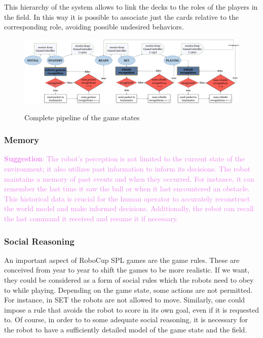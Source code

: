 \documentclass[a4paper, onecolumn, 12pt]{article}
\newcommand\suggestion[1]{\textcolor{violet}{\textbf{Suggestion}: #1}}
\begin{document}
This hierarchy of the system allows to link the decks to the roles of the players in the field. 
In this way it is possible to associate just the cards relative to the corresponding role, avoiding
possible undesired behaviors. 


\begin{figure}
    \centering
    \includegraphics[width=0.9\linewidth]{assets/flowchart.png}
    \label{fig:flowchart}
    \caption{Complete pipeline of the game states}
\end{figure}

\subsubsection{Memory}
\suggestion{
    The robot's perception is not limited to the current state of the environment; 
    it also utilizes past information to inform its decisions. The robot maintains 
    a memory of past events and when they occurred. For instance, it can remember the 
    last time it saw the ball or when it last encountered an obstacle. This historical 
    data is crucial for the human operator to accurately reconstruct the world model 
    and make informed decisions. Additionally, the robot can recall the last command 
    it received and resume it if necessary.
}

\subsubsection{Social Reasoning}

An important aspect of RoboCup SPL games are the game rules. These are conceived
from year to year to shift the games to be more realistic. If we want, they
could be considered as a form of social rules which the robots need to obey to
while playing. Depending on the game state, some actions are not permitted. For
instance, in SET the robots are not allowed to move. Similarly, one could impose
a rule that avoids the robot to score in its own goal, even if it is requested
to. Of course, in order to to some adequate social reasoning, it is necessary
for the robot to have a sufficiently detailed model of the game state and the
field.
\end{document}
